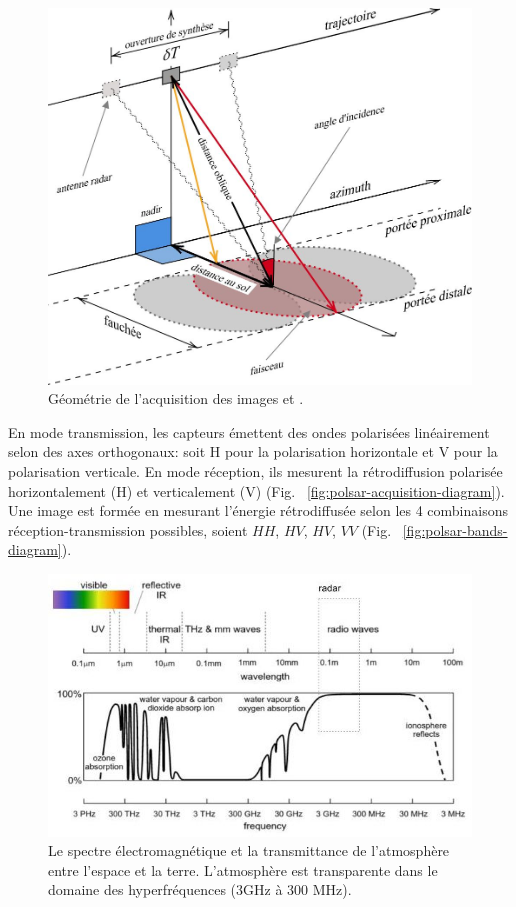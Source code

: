 \begin{figure}[!htbp] 
  \includegraphics[width=0.85 \linewidth]{figures/sar-geom-diagram.jpg}
   \centering
\caption
{\small Géométrie de l'acquisition des images \acrsar et \acrpolsarns.}
  \label{fig:sar-geoms-diagram}
\end{figure}

En mode transmission,  les capteurs \acrpolsar émettent des ondes polarisées linéairement selon des axes orthogonaux: soit H pour la polarisation horizontale et V pour la polarisation verticale.  En mode réception, ils mesurent la rétrodiffusion polarisée horizontalement (H) et verticalement (V) (Fig. ~\ref{fig:polsar-acquisition-diagram}). Une image \acrpolsar est formée en mesurant l’énergie rétrodiffusée selon les 4 combinaisons réception-transmission possibles, soient $HH$, $HV$, $HV$, $VV$ (Fig. ~\ref{fig:polsar-bands-diagram}).


\begin{figure}[!htbp] 
  \includegraphics[width=0.80 \linewidth]{figures/atm-windows-diagram.jpg} 
   \centering
\caption
{\small Le spectre électromagnétique et la transmittance de l'atmosphère entre l'espace et la terre.  L'atmosphère est transparente dans le domaine des hyperfréquences (3GHz à 300 MHz). \cite{Richards:2009:RSI:1816335} }
  \label{fig:atm-windows-diagram}
\end{figure}


